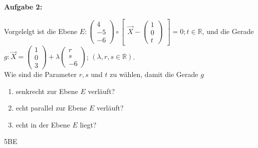 \documentclass[a4paper,12pt]{article}
\newcommand{\Aufgabe}[1]{
  {
  \vspace*{0.5cm}
  \textsf{\textbf{Aufgabe #1}}
  \vspace*{0.2cm}
  
  }
}
\begin{document}
\Aufgabe{2:}
Vorgelelgt ist die Ebene $E:\begin{pmatrix}4\\-5\\-6 \end{pmatrix}\circ
  \begin{bmatrix}\vec{X}-\begin{pmatrix}1\\0\\t\end{pmatrix}\end{bmatrix} = 0; t\in\mathbb{R}$,
  und die Gerade $g: \vec{X} = \begin{pmatrix}1 \\ 0 \\3 \end{pmatrix}
                     + \lambda \begin{pmatrix}r \\ s \\-6 \end{pmatrix}$;
                       $(\lambda, r, s \in \mathbb{R})$.\\
Wie sind die Parameter $r, s$ und $t$ zu wählen, damit die Gerade $g$
\begin{enumerate}[label={\alph*)}]
\item senkrecht zur Ebene $E$ verläuft?
\item echt parallel zur Ebene $E$ verläuft?
\item echt in der Ebene  $E$ liegt? 
\end{enumerate}

\begin{flushright}5BE \end{flushright}



\end{document}
